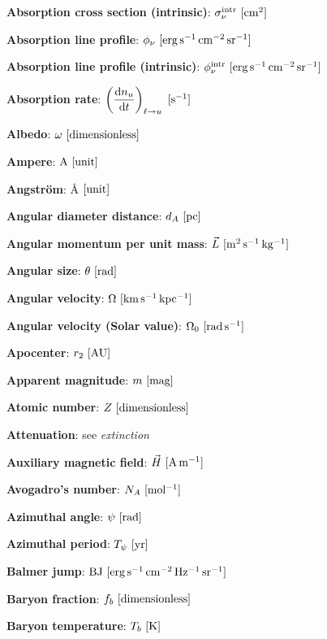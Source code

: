 \documentclass[a4paper,10pt]{article}
\begin{document}
{\noindent}\textbf{Absorption cross section (intrinsic)}: $\sigma_\nu^{\rm intr} ~ [{\rm cm^{2}}]$

{\noindent}\textbf{Absorption line profile}: $\phi_\nu ~ [{\rm erg\,s^{-1}\,cm^{-2}\,sr^{-1}}]$

{\noindent}\textbf{Absorption line profile (intrinsic)}: $\phi_\nu^{\rm intr} ~ [{\rm erg\,s^{-1}\,cm^{-2}\,sr^{-1}}]$

{\noindent}\textbf{Absorption rate}: $\left(\dfrac{{\rm d}n_u}{{\rm d}t}\right)_{\ell\rightarrow u} ~ [{\rm s^{-1}}]$

{\noindent}\textbf{Albedo}: $\omega ~ [{\rm dimensionless}]$

{\noindent}\textbf{Ampere}: ${\rm A} ~ [{\rm unit}]$

{\noindent}\textbf{Angstr\"{o}m}: \AA$ ~ [{\rm unit}]$

{\noindent}\textbf{Angular diameter distance}: $d_A ~ [{\rm pc}]$

{\noindent}\textbf{Angular momentum per unit mass}: $\vec{L} ~ [{\rm m^2\,s^{-1}\,kg^{-1}}]$

{\noindent}\textbf{Angular size}: $\theta ~ [{\rm rad}]$

{\noindent}\textbf{Angular velocity}: $\Omega ~ [{\rm km\,s^{-1}\,kpc^{-1}}]$

{\noindent}\textbf{Angular velocity (Solar value)}: $\Omega_0 ~ [{\rm rad\,s^{-1}}]$

{\noindent}\textbf{Apocenter}: $r_2 ~ [{\rm AU}]$

{\noindent}\textbf{Apparent magnitude}: $m ~ [{\rm mag}]$

{\noindent}\textbf{Atomic number}: $Z ~ [{\rm dimensionless}]$

{\noindent}\textbf{Attenuation}: see \textit{extinction}

{\noindent}\textbf{Auxiliary magnetic field}: $\vec{H} ~ [{\rm A\,m^{-1}}]$

{\noindent}\textbf{Avogadro's number}: $N_A ~ [{\rm mol^{-1}}]$

{\noindent}\textbf{Azimuthal angle}: $\psi ~ [{\rm rad}]$

{\noindent}\textbf{Azimuthal period}: $T_\psi ~ [{\rm yr}]$

{\noindent}\textbf{Balmer jump}: ${\rm BJ} ~ [{\rm erg\,s^{-1}\,cm^{-2}\,Hz^{-1}\,sr^{-1}}]$

{\noindent}\textbf{Baryon fraction}: $f_b ~ [{\rm dimensionless}]$

{\noindent}\textbf{Baryon temperature}: $T_b ~ [{\rm K}]$
\end{document}
